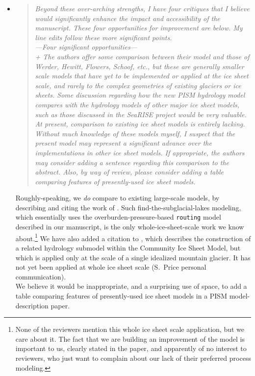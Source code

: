 \documentclass[11pt,reqno]{amsart}
\newcommand{\reply}[2]{
\medskip\medskip
\item  \begin{quote}
\emph{#1}
\end{quote}

\medskip
\noindent #2}
\begin{document}
\begin{itemize}
\reply{Beyond these over-arching strengths, I have four critiques that I believe would significantly enhance the impact and accessibility of the manuscript. These four opportunities for improvement are below. My line edits follow these more significant points.\\
---Four significant opportunities---\\
+ The authors offer some comparison between
their model and those of Werder, Hewitt, Flowers, Schoof, etc., but these are generally smaller scale models that have yet to be implemented or applied at the ice sheet
scale, and rarely to the complex geometries of existing glaciers or ice sheets. Some
discussion regarding how the new PISM hydrology model compares with the hydrology models of other major ice sheet models, such as those discussed in the SeaRISE
project would be very valuable.  At present, comparison to existing ice sheet models is
entirely lacking.  Without much knowledge of these models myself, I suspect that the
present model may represent a significant advance over the implementations in other
ice sheet models.  If appropriate, the authors may consider adding a sentence regarding this comparison to the abstract.  Also, by way of review, please consider adding a
table comparing features of presently-used ice sheet models.}
{Roughly-speaking, we \emph{do} compare to existing large-scale models, by describing and citing the work of \cite{JohnsonFastook,LeBrocqetal2009,Siegertetal2009}.  Such find-the-subglacial-lakes modeling, which essentially uses the overburden-pressure-based \texttt{routing} model described in our manuscript, is the only whole-ice-sheet-scale work we know about.\footnote{None of the reviewers mention this whole ice sheet scale application, but we care about it.  The fact that we are building an improvement of the \cite{LeBrocqetal2009,Siegertetal2009} model is important to us, clearly stated in the paper, and apparently of no interest to reviewers, who just want to complain about our lack of their preferred process modeling.}  We have also added a citation to \cite{HoffmanPrice2014}, which describes the construction of a related hydrology submodel within the Community Ice Sheet Model, but which is applied only at the scale of a single idealized mountain glacier.  It has not yet been applied at whole ice sheet scale (S.~Price personal communication).\\
\indent We believe it would be inappropriate, and a surprising use of space, to add a table comparing features of presently-used ice sheet models in a PISM model-description paper.}


\end{itemize}
\end{document}
